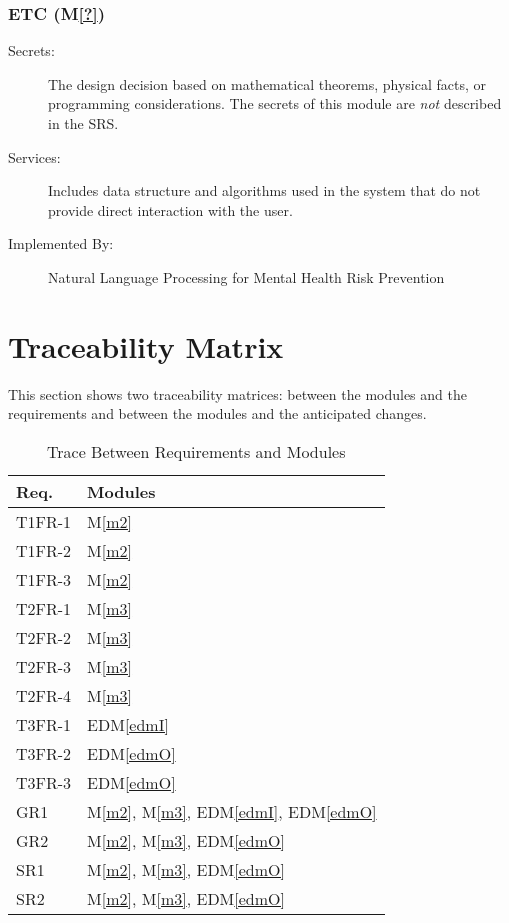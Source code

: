 \documentclass[12pt, titlepage]{article}
\newcommand{\mref}[1]{M\ref{#1}}
\newcommand{\edmref}[1]{EDM\ref{#1}}
\begin{document}
\subsubsection{ETC (\mref{?})}
\begin{description}
\item[Secrets:] The design decision based on mathematical theorems, physical
  facts, or programming considerations. The secrets of this module are
  \emph{not} described in the SRS.
\item[Services:] Includes data structure and algorithms used in the system that
  do not provide direct interaction with the user. 
\item[Implemented By:] Natural Language Processing for Mental Health Risk Prevention
\end{description}

\section{Traceability Matrix} \label{SecTM}

This section shows two traceability matrices: between the modules and the
requirements and between the modules and the anticipated changes.

\begin{table}[H]
\centering
\begin{tabular}{p{} p{}}
\toprule
\textbf{Req.} & \textbf{Modules}\\
\midrule
T1FR-1 & \mref{m2}\\
T1FR-2 & \mref{m2}\\
T1FR-3 & \mref{m2}\\
T2FR-1 & \mref{m3}\\
T2FR-2 & \mref{m3}\\
T2FR-3 & \mref{m3}\\
T2FR-4 & \mref{m3}\\
T3FR-1 & \edmref{edmI}\\
T3FR-2 & \edmref{edmO}\\
T3FR-3 & \edmref{edmO}\\
GR1 & \mref{m2}, \mref{m3}, \edmref{edmI}, \edmref{edmO}\\
GR2 & \mref{m2}, \mref{m3}, \edmref{edmO}\\
SR1 & \mref{m2}, \mref{m3}, \edmref{edmO}\\
SR2 & \mref{m2}, \mref{m3}, \edmref{edmO}\\

\bottomrule
\end{tabular}
\caption{Trace Between Requirements and Modules}
\label{TblRT}
\end{table}
\end{document}
